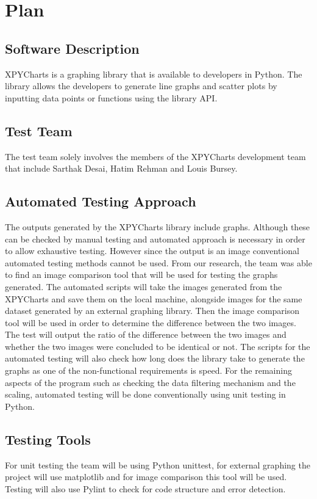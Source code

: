 \documentclass[12pt, titlepage]{article}
\begin{document}
\section{Plan}
	
\subsection{Software Description}
XPYCharts is a graphing library that is available to developers in Python. The library allows the developers to generate line graphs and scatter plots by inputting data points or functions using the library API.
\subsection{Test Team}
The test team solely involves the members of the XPYCharts development team that include Sarthak Desai, Hatim Rehman and Louis Bursey.
\subsection{Automated Testing Approach}
The outputs generated by the XPYCharts library include graphs. Although these can be checked by manual testing and automated approach is necessary in order to allow exhaustive testing. However since the output is an image conventional automated testing methods cannot be used. From our research, the team was able to find an image comparison tool that will be used for testing the graphs generated. The automated scripts will take the images generated from the XPYCharts and save them on the local machine, alongside images for the same dataset generated by an external graphing library. Then the image comparison tool will be used in order to determine the difference between the two images. The test will output the ratio of the difference between the two images and whether the two images were concluded to be identical or not. The scripts for the automated testing will also check how long does the library take to generate the graphs as one of the non-functional requirements is speed. For the remaining aspects of the program such as checking the data filtering mechanism and the scaling, automated testing will be done conventionally using unit testing in Python.
\subsection{Testing Tools}
For unit testing the team will be using Python unittest, for external graphing the project will use matplotlib and for image comparison this tool will be used. Testing will also use Pylint to check for code structure and error detection. 
\end{document}
